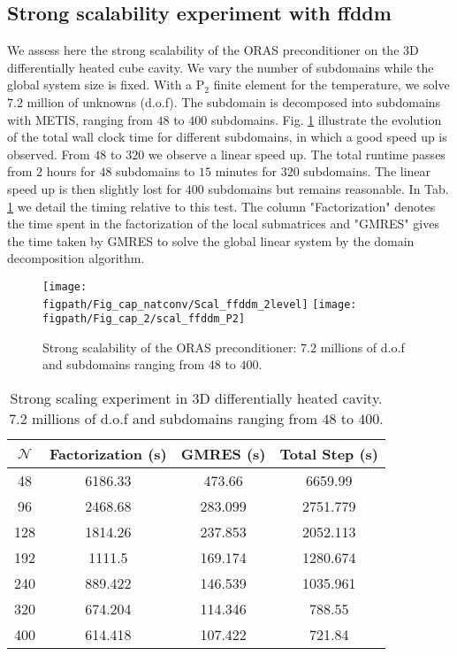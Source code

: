 \subsection{Strong scalability experiment with ffddm} \label{sub-scal-ffddm}
We assess here the strong scalability of the ORAS preconditioner on the 3D differentially heated cube cavity.
We vary the number of subdomains while the global system size is fixed.
With a P$_2$ finite element for the temperature, we solve $7.2$ million of unknowns (d.o.f).
The subdomain is decomposed into subdomains with METIS, ranging from $48$ to $400$ subdomains.
Fig. \ref{fig-scalability} illustrate the evolution of the total wall clock time for different subdomains, in which a good speed up is observed.
From $48$ to $320$ we observe a linear speed up. 
The total runtime passes from $2$ hours for $48$ subdomains to $15$ minutes for $320$ subdomains.
The linear speed up is then slightly lost for $400$ subdomains but remains reasonable.
In Tab. \ref{tab-scalability} we detail the timing relative to this test.
The column "Factorization" denotes the time spent in the factorization of the local submatrices and "GMRES" gives the time taken by GMRES to solve the global linear system
by the domain decomposition algorithm.

\begin{figure}%
\begin{minipage}{\linewidth}
\begin{center}
 {\texttt{[image: \\figpath/Fig\_cap\_natconv/Scal\_ffddm\_2level]}}
 {\texttt{[image: \\figpath/Fig\_cap\_2/scal\_ffddm\_P2]}}
\end{center}
\end{minipage}
\caption{Strong scalability of the ORAS preconditioner: $7.2$ millions of d.o.f and subdomains ranging from $48$ to $400$.}
\label{fig-scalability} 
\end{figure}

\begin{table}[!h]
	\begin{center}
		\begin{tabular}{cccc}
			 $\mathcal{N}$ & Factorization (s)  & GMRES (s)  & Total Step (s) \\ \hline \hline
			 48 & 6186.33  & 473.66  &  6659.99 \\
			 96 & 2468.68  & 283.099 &  2751.779 \\
			 128 & 1814.26 &  237.853 &   2052.113\\
			 192 & 1111.5  &   169.174 &  1280.674 \\
			 240 & 889.422  & 146.539 &  1035.961\\
			 320 & 674.204   &  114.346 & 788.55 \\
			 400 & 614.418  &  107.422 &  721.84\\ \hline
		\end{tabular}
	\end{center}
	\caption {Strong scaling experiment in 3D differentially heated cavity. $7.2$ millions of d.o.f and subdomains ranging from $48$ to $400$. }
	\label{tab-scalability}
\end{table}



